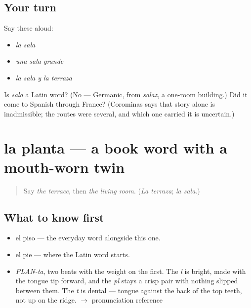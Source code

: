 \subsection*{Your turn}
Say these aloud:

\begin{itemize}
\raggedright
  \item \emph{la sala}
  \item \emph{una sala grande}
  \item \emph{la sala y la terraza}
\end{itemize}

\begin{tcolorbox}[breakable,colback=teal!4,colframe=teal!35!black,title={Before you move on}]
Is \emph{sala} a Latin word? (No — Germanic, from \emph{salaz}, a one-room building.) Did it come to Spanish through France? (Corominas says that story alone is inadmissible; the routes were several, and which one carried it is uncertain.)
\end{tcolorbox}
\section[la planta]{la planta — a book word with a mouth-worn twin}

\label{lesson:ES-C390-planta}



\begin{quote}
Say \emph{the terrace}, then \emph{the living room}. (\emph{La terraza}; \emph{la sala}.)
\end{quote}

\subsection*{What to know first}
\begin{itemize}
\raggedright
  \item el piso — the everyday word alongside this one.
  \item el pie — where the Latin word starts.
\end{itemize}

\begin{sounds}
\begin{itemize}
\raggedright
  \item \emph{PLAN-ta}, two beats with the weight on the first. The \emph{l} is bright, made with the tongue tip forward, and the \emph{pl} stays a crisp pair with nothing slipped between them. The \emph{t} is dental — tongue against the back of the top teeth, not up on the ridge. $\to$ pronunciation reference
\end{itemize}
\end{sounds}

